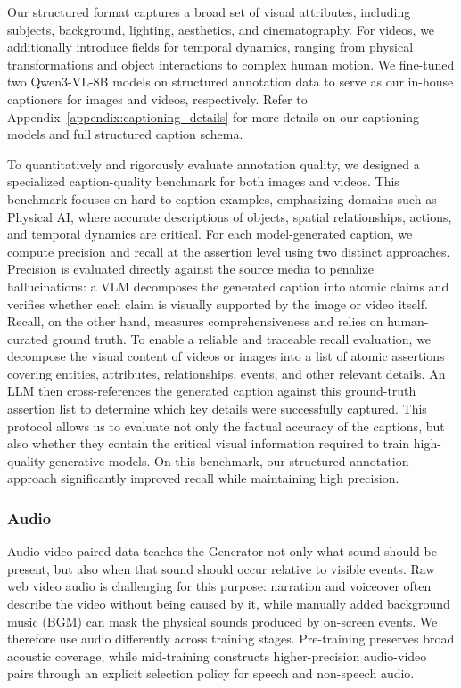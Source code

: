 \documentclass{llmxive}
\begin{document}
Our structured format captures a broad set of visual attributes, including subjects, background, lighting, aesthetics, and cinematography. For videos, we additionally introduce fields for temporal dynamics, ranging from physical transformations and object interactions to complex human motion. We fine-tuned two \mbox{Qwen3-VL-8B} models on structured annotation data to serve as our in-house captioners for images and videos, respectively. Refer to Appendix~\ref{appendix:captioning_details} for more details on our captioning models and full structured caption schema.

To quantitatively and rigorously evaluate annotation quality, we designed a specialized caption-quality benchmark for both images and videos. This benchmark focuses on hard-to-caption examples, emphasizing domains such as Physical AI, where accurate descriptions of objects, spatial relationships, actions, and temporal dynamics are critical. For each model-generated caption, we compute precision and recall at the assertion level using two distinct approaches. Precision is evaluated directly against the source media to penalize hallucinations: a VLM decomposes the generated caption into atomic claims and verifies whether each claim is visually supported by the image or video itself. Recall, on the other hand, measures comprehensiveness and relies on human-curated ground truth. To enable a reliable and traceable recall evaluation, we decompose the visual content of videos or images into a list of atomic assertions covering entities, attributes, relationships, events, and other relevant details. An LLM then cross-references the generated caption against this ground-truth assertion list to determine which key details were successfully captured. This protocol allows us to evaluate not only the factual accuracy of the captions, but also whether they contain the critical visual information required to train high-quality generative models. On this benchmark, our structured annotation approach significantly improved recall while maintaining high precision.

\subsubsection{Audio}
\label{subsubsec::data_gen_audio}

Audio-video paired data teaches the Generator not only what sound should be present, but also when that sound should occur relative to visible events. Raw web video audio is challenging for this purpose: narration and voiceover often describe the video without being caused by it, while manually added background music (BGM) can mask the physical sounds produced by on-screen events. We therefore use audio differently across training stages. Pre-training preserves broad acoustic coverage, while mid-training constructs higher-precision audio-video pairs through an explicit selection policy for speech and non-speech audio.
\end{document}
